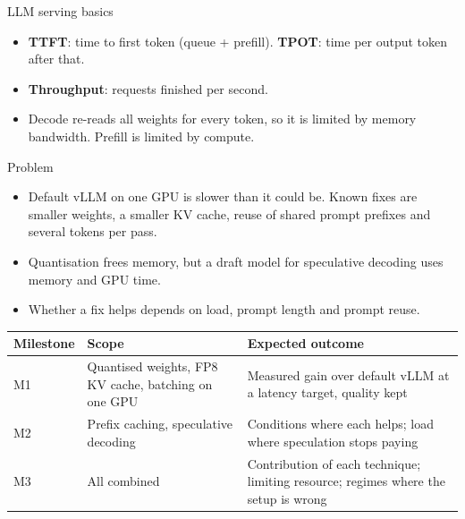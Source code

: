 \documentclass[aspectratio=169,10pt,t]{beamer}
\newenvironment{points}{\raggedright\begin{itemize}\setlength{\itemsep}{.46em}}{\end{itemize}}
\begin{document}
\begin{frame}{LLM serving basics}
\centering
{}
\par\raggedright\vspace{.15cm}
\begin{points}
\item \textbf{TTFT}: time to first token (queue + prefill). \textbf{TPOT}: time per output token after that.
\item \textbf{Throughput}: requests finished per second.
\item Decode re-reads all weights for every token, so it is limited by memory bandwidth. Prefill is limited by compute.
\end{points}
\end{frame}

\begin{frame}{Problem}
\begin{points}
\item Default vLLM on one GPU is slower than it could be. Known fixes are smaller weights, a smaller KV cache, reuse of shared prompt prefixes and several tokens per pass.
\item Quantisation frees memory, but a draft model for speculative decoding uses memory and GPU time.
\item Whether a fix helps depends on load, prompt length and prompt reuse.
\end{points}
\vspace{.12cm}
\centering
\begin{tabularx}{\linewidth}{@{}P{1.2cm}P{4.3cm}X@{}}
\toprule
Milestone & Scope & Expected outcome\\
\midrule
M1 & Quantised weights, FP8 KV cache, batching on one GPU & Measured gain over default vLLM at a latency target, quality kept\\
M2 & Prefix caching, speculative decoding & Conditions where each helps; load where speculation stops paying\\
M3 & All combined & Contribution of each technique; limiting resource; regimes where the setup is wrong\\
\bottomrule
\end{tabularx}\par
\end{frame}
\end{document}

